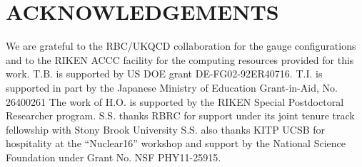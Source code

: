 \documentclass{PoS}
\begin{document}
\section*{ACKNOWLEDGEMENTS}
We are grateful to the RBC/UKQCD collaboration for the gauge configurations
and to the RIKEN ACCC facility for the computing resources provided for this work.
T.B. is supported by US DOE grant DE-FG02-92ER40716.
T.I. is supported in part by the Japanese Ministry of Education Grant-in-Aid, No.
26400261
The work of H.O. is supported by the RIKEN Special Postdoctoral Researcher program.
S.S. thanks RBRC for support under its joint tenure track fellowship with
Stony Brook University
S.S. also thanks KITP UCSB for hospitality at the ``Nuclear16'' workshop
and support by the National Science Foundation under Grant No. NSF PHY11-25915.




\end{document}
